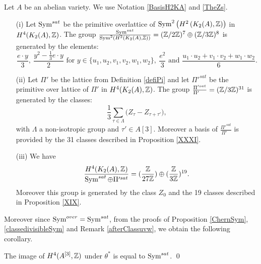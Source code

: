 \begin{thm}\label{integralbasistheorem}
Let $A$ be an abelian variety. We use Notation \ref{BasisH2KA} and \ref{TheZs}. 
\begin{itemize}
\item[(i)]
Let $\operatorname{Sym}^{sat}$ be the primitive overlattice of $\operatorname{Sym}^2\left(H^2\left(K_{ 2 }( A ),\mathbb{Z}\right)\right)$ in $H^4(K_2(A),\mathbb{Z})$.
The group $\frac{\operatorname{Sym}^{sat}}{\operatorname{Sym}^2\left(H^2\left(K_{ 2 }( A ),\mathbb{Z}\right)\right)}=(\mathbb{Z}/2\mathbb{Z})^{7}\oplus(\mathbb{Z}/3\mathbb{Z})^{8}$ is generated by the elements:
$$\frac{e \cdot y}{3},\ \frac{y^2 - \frac{1}{3} e\cdot y}{2} \text{ for } y\in\{u_1,u_2,v_1,v_2,w_1,w_2\},\ 
\frac{e^2}{3} \text{ and } \frac{u_{1}\cdot u_{2}+v_{1}\cdot v_{2}+w_{1}\cdot w_{2}}{6}.$$
\item[(ii)]
Let $\Pi'$ be the lattice from Definition \ref{defiPi} and let $\Pi'^{sat}$ be the primitive over lattice of $\Pi'$ in $H^4(K_2(A),\mathbb{Z})$.
The group $\frac{\Pi'^{sat}}{\Pi'\ \ \ }=(\mathbb{Z}/3\mathbb{Z})^{31}$ is generated by the classes:
$$\frac{1}{3}\sum_{\tau\in\Lambda} \Big(Z_{\tau} - Z_{\tau+\tau'}\Big),
$$
with $\Lambda$ a non-isotropic group and $\tau'\in A[3]$. Moreover a basis of $\frac{\Pi'^{sat}}{\Pi'\ \ \ }$ is provided by the 31 classes described in Proposition \ref{XXXI}. 
\item[(iii)]
We have $$\frac{H^4(K_2(A),\mathbb{Z})}{\operatorname{Sym}^{sat}\oplus\Pi'^{sat}}=(\frac{\mathbb{Z}}{27\mathbb{Z}})\oplus(\frac{\mathbb{Z}}{3\mathbb{Z}})^{19}.$$
Moreover this group is generated by the class $Z_0$ and the 19 classes described in Proposition \ref{XIX}.
\end{itemize}
\end{thm}
Moreover since $\operatorname{Sym}^{over}=\operatorname{Sym}^{sat}$, from the proofs of Proposition \ref{ChernSym}, \ref{classedivisibleSym} and Remark \ref{afterClassuvw}, we obtain the following corollary.
\begin{corollary}\label{SymSatImage}
The image of $H^4(A^{[3]},\mathbb{Z})$ under $\theta^*$ is equal to $\operatorname{Sym}^{sat}$. \qed
\end{corollary}
